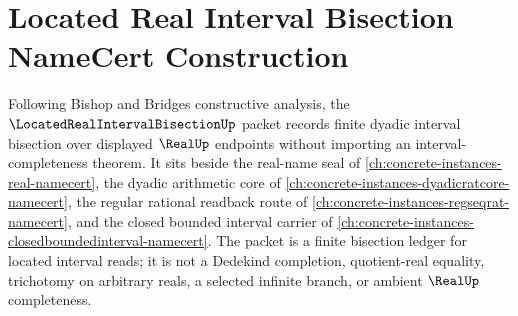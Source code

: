 \chapter{Located Real Interval Bisection NameCert Construction}
\label{ch:concrete-instances-located-real-interval-bisection-namecert}

Following Bishop and Bridges constructive analysis, the $\LocatedRealIntervalBisectionUp$ packet records finite dyadic interval bisection over displayed $\RealUp$ endpoints without importing an interval-completeness theorem. It sits beside the real-name seal of \autoref{ch:concrete-instances-real-namecert}, the dyadic arithmetic core of \autoref{ch:concrete-instances-dyadicratcore-namecert}, the regular rational readback route of \autoref{ch:concrete-instances-regseqrat-namecert}, and the closed bounded interval carrier of \autoref{ch:concrete-instances-closedboundedinterval-namecert}. The packet is a finite bisection ledger for located interval reads; it is not a Dedekind completion, quotient-real equality, trichotomy on arbitrary reals, a selected infinite branch, or ambient $\RealUp$ completeness.


